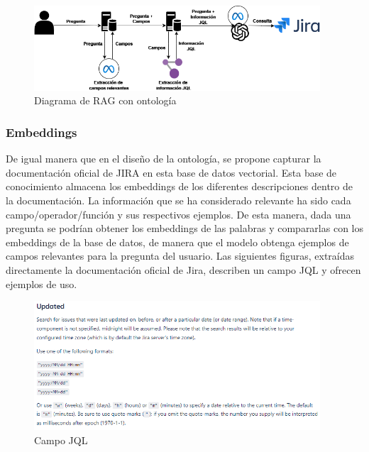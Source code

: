 \begin{figure}[H]
    \centering
    \includegraphics[width=0.95\textwidth]{images/rag_ontologia.png}
    \caption{Diagrama de RAG con ontología}\label{fig:ontologia}
\end{figure}


\subsubsection{Embeddings}
De igual manera que en el diseño de la ontología, se propone capturar la documentación oficial de JIRA en esta base de datos vectorial. Esta base de conocimiento almacena los embeddings de los diferentes descripciones dentro de la documentación. La información que se ha considerado relevante ha sido cada campo/operador/función y sus respectivos ejemplos. De esta manera, dada una pregunta se podrían obtener los embeddings de las palabras y compararlas con los embeddings de la base de datos, de manera que el modelo obtenga ejemplos de campos relevantes para la pregunta del usuario. Las siguientes figuras, extraídas directamente la documentación oficial de Jira, describen un campo JQL y ofrecen ejemplos de uso.
\begin{figure}[H]
    \centering
    \includegraphics[width=0.95\textwidth]{images/JQL_docs_updated1.png}
    \caption{Campo JQL}\label{fig:field}
\end{figure}
